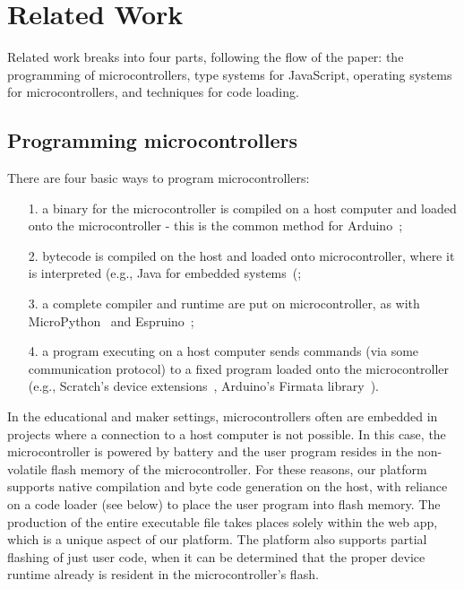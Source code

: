 \section{Related Work}
\label{sec:related}

Related work breaks into four parts, following the
flow of the paper: the programming of microcontrollers, 
type systems for JavaScript, operating systems
for microcontrollers, and techniques for code loading.

\subsection{Programming microcontrollers}

There are four basic ways to program microcontrollers:
\begin{itemize}
\item[1.] a binary for the microcontroller is compiled on a host computer and loaded onto the microcontroller -
this is the common method for Arduino~\cite{buildingArduino2014};
\item[2.] bytecode is compiled on the host and loaded onto microcontroller, where it is interpreted
(e.g., Java for embedded systems~\cite{ClausenTOPLAS}(;
\item[3.] a complete compiler and runtime are put on microcontroller, as with MicroPython~\cite{MicroPython} 
and Espruino~\cite{Espruino};
\item[4.] a program executing on a host computer sends commands (via some communication protocol) 
to a fixed program loaded onto the microcontroller (e.g., Scratch's
device extensions~\cite{ScratchCACM2009}, Arduino's Firmata library~\cite{Firmata}).
\end{itemize}

In the educational and maker settings, microcontrollers often are embedded in projects where a 
connection to a host computer is not possible. In this case, the microcontroller is powered by battery and
the user program resides in the non-volatile flash memory of the microcontroller. For these
reasons, our platform supports native compilation and byte code generation on the host,
with reliance on a code loader (see below) to place the user program into flash memory. 
The production of the entire executable file
takes places solely within the web app, which is a unique aspect of our platform.
The platform also supports partial flashing of just user code, 
when it can be determined that the proper device runtime already is resident in the microcontroller's flash.

